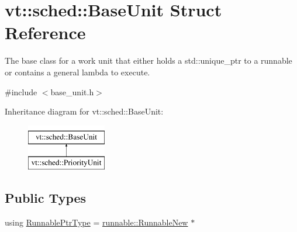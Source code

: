 \hypertarget{structvt_1_1sched_1_1_base_unit}{}\section{vt\+:\+:sched\+:\+:Base\+Unit Struct Reference}
\label{structvt_1_1sched_1_1_base_unit}


The base class for a work unit that either holds a {\ttfamily std\+::unique\+\_\+ptr} to a runnable or contains a general lambda to execute.  




{\ttfamily \#include $<$base\+\_\+unit.\+h$>$}

Inheritance diagram for vt\+:\+:sched\+:\+:Base\+Unit\+:\begin{figure}[H]
\begin{center}
\leavevmode
\includegraphics[height=2.000000cm]{structvt_1_1sched_1_1_base_unit}
\end{center}
\end{figure}
\subsection*{Public Types}
\begin{DoxyCompactItemize}
\item 
using \hyperlink{structvt_1_1sched_1_1_base_unit_ab635b72e57c53fa666d30bbfe5a0df17}{Runnable\+Ptr\+Type} = \hyperlink{structvt_1_1runnable_1_1_runnable_new}{runnable\+::\+Runnable\+New} $\ast$
\end{DoxyCompactItemize}
